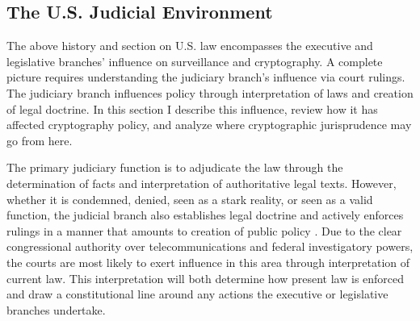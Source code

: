
\lawsend

\subsection{The U.S. Judicial Environment}
\label{sec-us-judicial}

The above history and section on U.S. law encompasses the executive and legislative branches' influence on surveillance
and cryptography. A complete picture requires understanding the judiciary branch's influence via court rulings. The
judiciary branch influences policy through interpretation of laws and creation of legal doctrine. In this section I
describe this influence, review how it has affected cryptography policy, and analyze where cryptographic jurisprudence
may go from here.

The primary judiciary function is to adjudicate the law through the determination of facts and interpretation of
authoritative legal texts. However, whether it is condemned, denied, seen as a stark reality, or seen as a valid
function, the judicial branch also establishes legal doctrine and actively enforces rulings in a manner that amounts to
creation of public policy \cite{feeley_judicial_2000}. Due to the clear congressional authority over telecommunications
and federal investigatory powers, the courts are most likely to exert influence in this area through interpretation of
current law. This interpretation will both determine how present law is enforced and draw a constitutional line around
any actions the executive or legislative branches undertake.

